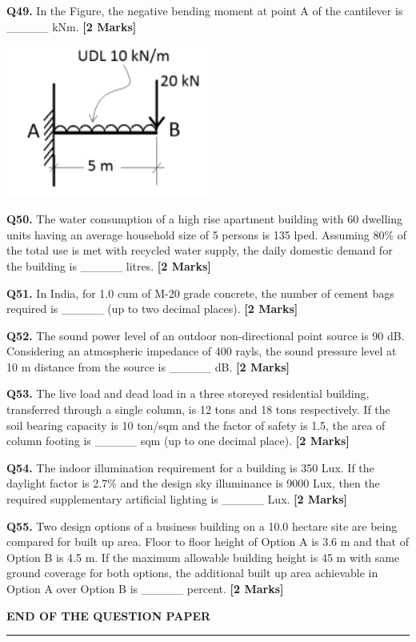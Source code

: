 \documentclass[11pt]{article}
\newcommand{\questionb}[2]{
    \noindent\textbf{Q#2.} #1 \hfill \textbf{[2 Marks]}
}
\begin{document}
\questionb{In the Figure, the negative bending moment at point A of the cantilever is \_\_\_\_\_ kNm.}{49}
\begin{center}
\includegraphics[width=0.5\textwidth]{figures/Q49}
\end{center}
\vspace{0.5cm}

\questionb{The water consumption of a high rise apartment building with 60 dwelling units having an average household size of 5 persons is 135 lped. Assuming 80\% of the total use is met with recycled water supply, the daily domestic demand for the building is \_\_\_\_\_ litres.}{50}
\vspace{0.5cm}

\questionb{In India, for 1.0 cum of M-20 grade concrete, the number of cement bags required is \_\_\_\_\_ (up to two decimal places).}{51}
\vspace{0.5cm}

\questionb{The sound power level of an outdoor non-directional point source is 90 dB. Considering an atmospheric impedance of 400 rayls, the sound pressure level at 10 m distance from the source is \_\_\_\_\_ dB.}{52}
\vspace{0.5cm}

\questionb{The live load and dead load in a three storeyed residential building, transferred through a single column, is 12 tons and 18 tons respectively. If the soil bearing capacity is 10 ton/sqm and the factor of safety is 1.5, the area of column footing is \_\_\_\_\_ sqm (up to one decimal place).}{53}
\vspace{0.5cm}

\questionb{The indoor illumination requirement for a building is 350 Lux. If the daylight factor is 2.7\% and the design sky illuminance is 9000 Lux, then the required supplementary artificial lighting is \_\_\_\_\_ Lux.}{54}
\vspace{0.5cm}

\questionb{Two design options of a business building on a 10.0 hectare site are being compared for built up area. Floor to floor height of Option A is 3.6 m and that of Option B is 4.5 m. If the maximum allowable building height is 45 m with same ground coverage for both options, the additional built up area achievable in Option A over Option B is \_\_\_\_\_ percent.}{55}
\vspace{1cm}

\begin{center}
\textbf{END OF THE QUESTION PAPER}
\rule{\textwidth}{0.5pt} 
\end{center}
\end{document}
